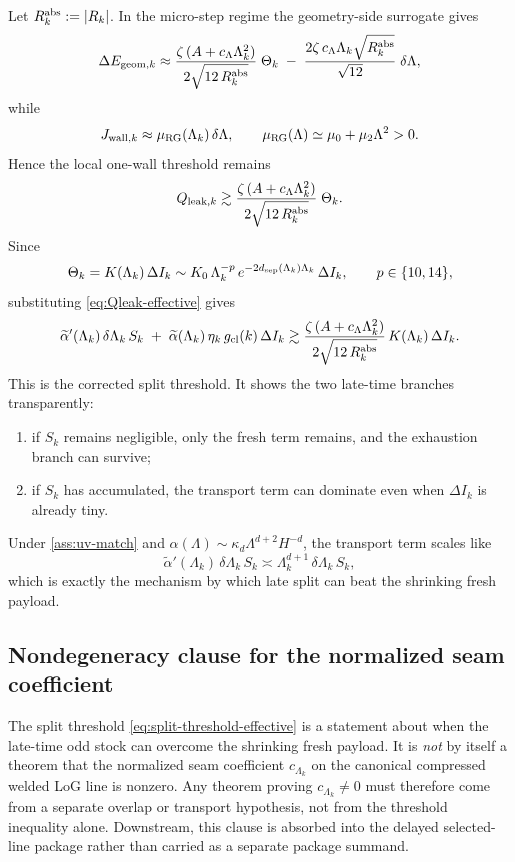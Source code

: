 Let \(R_k^{\rm abs}:=|R_k|\). In the micro-step regime the geometry-side surrogate gives
\[
\Delta E_{{\rm geom},k}
\approx
\frac{\zeta\,(A+c_\Lambda \Lambda_k^2)}{2\sqrt{12\,R_k^{\rm abs}}}\;\Theta_k
\;-\;
\frac{2\zeta\,c_\Lambda \Lambda_k\sqrt{R_k^{\rm abs}}}{\sqrt{12}}\;\delta\Lambda,
\]
while
\[
J_{{\rm wall},k}\approx \mu_{\rm RG}(\Lambda_k)\,\delta\Lambda,
\qquad
\mu_{\rm RG}(\Lambda)\simeq \mu_0+\mu_2\Lambda^2>0.
\]
Hence the local one-wall threshold remains
\begin{equation}
Q_{{\rm leak},k}
\gtrsim
\frac{\zeta\,(A+c_\Lambda \Lambda_k^2)}{2\sqrt{12\,R_k^{\rm abs}}}\;\Theta_k.
\label{eq:split-threshold-base}
\end{equation}
Since
\[
\Theta_k
=
K(\Lambda_k)\,\Delta I_k
\sim
K_0\,\Lambda_k^{-p}\,e^{-2d_{\rm sep}(\Lambda_k)\Lambda_k}\,\Delta I_k,
\qquad p\in\{10,14\},
\]
substituting \eqref{eq:Qleak-effective} gives
\begin{equation}
\widetilde\alpha'(\Lambda_k)\,\delta\Lambda_k\,S_k
\;+\;
\widetilde\alpha(\Lambda_k)\,\eta_k\,g_{\rm cl}(k)\,\Delta I_k
\gtrsim
\frac{\zeta\,(A+c_\Lambda \Lambda_k^2)}{2\sqrt{12\,R_k^{\rm abs}}}\,
K(\Lambda_k)\,\Delta I_k.
\label{eq:split-threshold-effective}
\end{equation}
This is the corrected split threshold. It shows the two late-time branches transparently:
\begin{enumerate}[leftmargin=2em]
\item if \(S_k\) remains negligible, only the fresh term remains, and the exhaustion branch can survive;
\item if \(S_k\) has accumulated, the transport term can dominate even when \(\Delta I_k\) is already tiny.
\end{enumerate}
Under \cref{ass:uv-match} and \(\alpha(\Lambda)\sim \kappa_d\Lambda^{d+2}H^{-d}\), the transport term scales like
\[
\widetilde\alpha'(\Lambda_k)\,\delta\Lambda_k\,S_k
\asymp
\Lambda_k^{d+1}\,\delta\Lambda_k\,S_k,
\]
which is exactly the mechanism by which late split can beat the shrinking fresh payload.

\subsection{Nondegeneracy clause for the normalized seam coefficient}
\label{subsec:separate-c-nondegeneracy}

The split threshold \eqref{eq:split-threshold-effective} is a statement about when the late-time
odd stock can overcome the shrinking fresh payload.
It is \emph{not} by itself a theorem that the normalized seam coefficient \(c_{\Lambda_k}\) on the
canonical compressed welded LoG line is nonzero.
Any theorem proving \(c_{\Lambda_k}\neq 0\) must therefore come from a separate overlap or transport
hypothesis, not from the threshold inequality alone.
Downstream, this clause is absorbed into the delayed selected-line package rather than carried as a
separate package summand.


